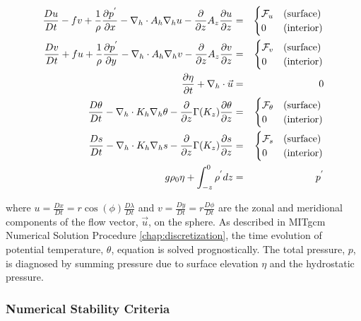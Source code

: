 \begin{eqnarray}
\label{eq:eg-global-model_equations}
\frac{Du}{Dt} - fv + 
  \frac{1}{\rho}\frac{\partial p^{'}}{\partial x} - 
  \nabla_{h}\cdot A_{h}\nabla_{h}u - 
  \frac{\partial}{\partial z}A_{z}\frac{\partial u}{\partial z} 
 & = &
\begin{cases}
{\cal F}_u & \text{(surface)} \\
0 & \text{(interior)}
\end{cases}
\\
\frac{Dv}{Dt} + fu + 
  \frac{1}{\rho}\frac{\partial p^{'}}{\partial y} - 
  \nabla_{h}\cdot A_{h}\nabla_{h}v - 
  \frac{\partial}{\partial z}A_{z}\frac{\partial v}{\partial z} 
& = &
\begin{cases}
{\cal F}_v & \text{(surface)} \\
0 & \text{(interior)}
\end{cases}
\\
\frac{\partial \eta}{\partial t} + \nabla_{h}\cdot \vec{u}
&=&
0
\\
\frac{D\theta}{Dt} -
 \nabla_{h}\cdot K_{h}\nabla_{h}\theta
 - \frac{\partial}{\partial z}\Gamma(K_{z})\frac{\partial\theta}{\partial z} 
& = &
\begin{cases}
{\cal F}_\theta & \text{(surface)} \\
0 & \text{(interior)}
\end{cases}
\\
\frac{D s}{Dt} -
 \nabla_{h}\cdot K_{h}\nabla_{h}s
 - \frac{\partial}{\partial z}\Gamma(K_{z})\frac{\partial s}{\partial z} 
& = &
\begin{cases}
{\cal F}_s & \text{(surface)} \\
0 & \text{(interior)}
\end{cases}
\\
g\rho_{0} \eta + \int^{0}_{-z}\rho^{'} dz & = & p^{'}
\end{eqnarray}

\noindent where $u=\frac{Dx}{Dt}=r \cos(\phi)\frac{D \lambda}{Dt}$ and 
$v=\frac{Dy}{Dt}=r \frac{D \phi}{Dt}$ 
are the zonal and meridional components of the
flow vector, $\vec{u}$, on the sphere. As described in
MITgcm Numerical Solution Procedure \ref{chap:discretization}, the time 
evolution of potential temperature, $\theta$, equation is solved prognostically.
The total pressure, $p$, is diagnosed by summing pressure due to surface 
elevation $\eta$ and the hydrostatic pressure.
\\

\subsubsection{Numerical Stability Criteria}

